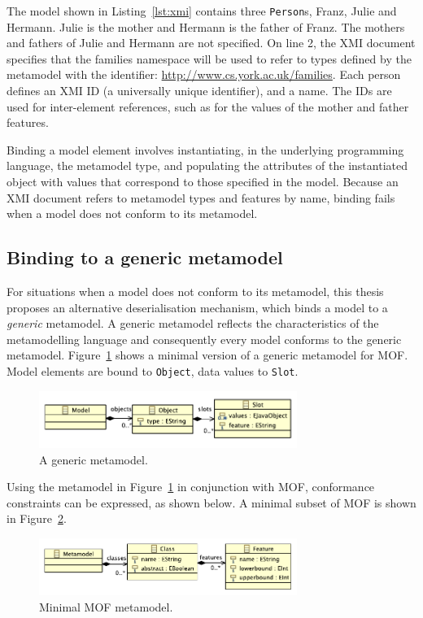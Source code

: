 The model shown in Listing~\ref{lst:xmi} contains three \texttt{Person}s, Franz, Julie and Hermann. Julie is the mother and Hermann is the father of Franz. The mothers and fathers of Julie and Hermann are not specified. On line 2, the XMI document specifies that the families namespace will be used to refer to types defined by the metamodel with the identifier: \url{http://www.cs.york.ac.uk/families}. Each person defines an XMI ID (a universally unique identifier), and a name. The IDs are used for inter-element references, such as for the values of the mother and father features.

Binding a model element involves instantiating, in the underlying programming language, the metamodel type, and populating the attributes of the instantiated object with values that correspond to those specified in the model. Because an XMI document refers to metamodel types and features by name, binding fails when a model does not conform to its metamodel. 


\subsection{Binding to a generic metamodel}
\label{subsec:binding}
For situations when a model does not conform to its metamodel, this thesis proposes an alternative deserialisation mechanism, which binds a model to a \emph{generic} metamodel. A generic metamodel reflects the characteristics of the metamodelling language and consequently every model conforms to the generic metamodel. Figure~\ref{fig:slot_model} shows a minimal version of a generic metamodel for MOF. Model elements are bound to \texttt{Object}, data values to \texttt{Slot}.

\begin{figure}[htbp]
  \centering
  \includegraphics[width=3.3in]{5.Implementation/slot_model.pdf}
  \caption{A generic metamodel.}
  \label{fig:slot_model}
\end{figure}

Using the metamodel in Figure~\ref{fig:slot_model} in conjunction with MOF, conformance constraints can be expressed, as shown below. A minimal subset of MOF is shown in Figure~\ref{fig:mof}.

\begin{figure}[htbp]
  \centering
  \includegraphics[width=3.3in]{5.Implementation/mof.pdf}
  \caption{Minimal MOF metamodel.}
  \label{fig:mof}
\end{figure}


